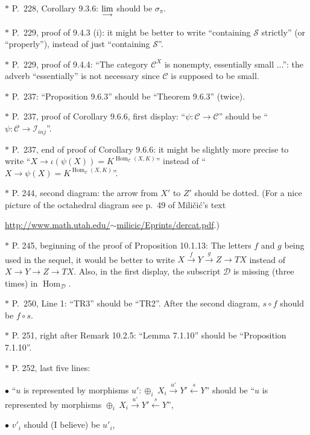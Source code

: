 \documentclass[12pt]{article}
\theoremstyle{remark}
\theoremstyle{definition}
\newcommand{\bu}{\bullet}
\newcommand{\cc}{\mathcal}
\newcommand{\C}{\mathcal C}
\newcommand{\xr}{\xrightarrow}
\newcommand{\ilim}{\operatornamewithlimits{\underset{\longrightarrow}{lim}}}
\DeclareMathOperator{\Hom}{Hom}%
\begin{document}
\noindent $*$ P.~228, Corollary 9.3.6: $\ilim$ should be $\sigma_\pi$.

\noindent $*$ P.~229, proof of 9.4.3 (i): it might be better to write ``containing $\mathcal S$ strictly'' (or ``properly''), instead of just ``containing $\mathcal S$''. 

\noindent $*$ P.~229, proof of 9.4.4: ``The category $\C^X$ is nonempty, essentially small ...'': the adverb ``essentially'' is not necessary since $\C$ is supposed to be small.

\noindent $*$ P.~237: ``Proposition 9.6.3'' should be ``Theorem 9.6.3'' (twice). 

\noindent $*$ P.~237, proof of Corollary 9.6.6, first display: ``$\psi:\C\to\C$'' should be ``$\psi:\C\to\mathcal I_{inj}$''. %

\noindent $*$ P.~237, end of proof of Corollary 9.6.6: it might be slightly more precise to write ``$X\to\iota(\psi(X))=K^{\Hom_\C(X,K)}$'' instead of ``$X\to\psi(X)=K^{\Hom_\C(X,K)}$''.

\noindent $*$ P. 244, second diagram: the arrow from $X'$ to $Z'$ should be dotted. (For a nice picture of the octahedral diagram see p.~49 of Mili\v{c}i\'c's text

\href{http://www.math.utah.edu/~milicic/Eprints/dercat.pdf}{http://www.math.utah.edu/$\sim$milicic/Eprints/dercat.pdf}.)

\noindent $*$ P. 245, beginning of the proof of Proposition 10.1.13: The letters $f$ and $g$ being used in the sequel, it would be better to write $X\xr fY\xr gZ\to TX$ instead of $X\to Y\to Z\to TX$. Also, in the first display, the subscript $\cc D$ is missing (three times) in $\Hom_{\cc D}$.

\noindent $*$ P.~250, Line 1: ``TR3'' should be ``TR2''. After the second diagram, $s\circ f$ should be $f\circ s$.

\noindent $*$ P. 251, right after Remark 10.2.5: ``Lemma 7.1.10'' should be ``Proposition 7.1.10''.

\noindent $*$ P. 252, last five lines:

$\bu$ ``$u$ is represented by morphisms $u':\oplus_i\ X_i\xr{u'}Y'\xleftarrow sY$'' should be ``$u$ is represented by morphisms $\oplus_i\ X_i\xr{u'}Y'\xleftarrow sY$'',

$\bu$ $v'_i$ should (I believe) be $u'_i$,

\end{document}
